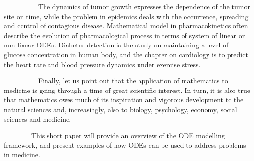 \par ~~~~~~~~~~The dynamics of tumor growth expresses the dependence of the tumor site on time, while the problem in epidemics deals with the occurrence, spreading and control of contagious disease.  Mathematical model in pharmacokinetics often describe the evolution of pharmacological process in terms of system of linear or non linear ODEs. Diabetes detection is the study on maintaining a level of glucose concentration in human body, and the chapter on cardiology is to predict the heart rate and blood pressure dynamics under exercise stress.

\par ~~~~~~~~~~Finally, let us point out that the application of mathematics to medicine is going through a time of great scientific interest. In turn, it is also true that mathematics owes much of its inspiration and vigorous development to the natural sciences and, increasingly, also to biology, psychology, economy, social sciences and medicine.
 
\par ~~~~~~~~This short paper will provide an overview of the ODE modelling framework, and present examples of how ODEs can be used to address problems in medicine.



